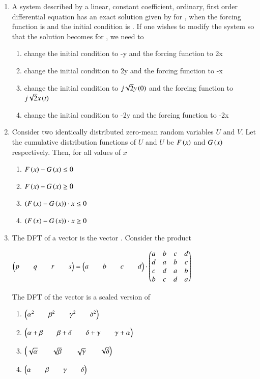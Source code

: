 \documentclass[journal,12pt,onecolumn]{IEEEtran}
\theoremstyle{remark}
\begin{document}
\begin{enumerate}
\item A system described by a linear, constant coefficient, ordinary, first order differential equation has an exact solution given by  for , when the forcing function is  and the initial condition is . If one wishes to modify the system so that the solution becomes for , we need to
\begin{enumerate}
\item change the initial condition to -y and the forcing function to 2x
\item change the initial condition to 2y and the forcing function to -x
\item change the initial condition to $j\sqrt{2}y\left(0\right)$ and the forcing function to $j\sqrt{2} x\left(t\right)$
\item change the initial condition to -2y and the forcing function to -2x
\end{enumerate}
\hfill {}

\item Consider two identically distributed zero-mean random variables $U$ and $V$. Let the cumulative distribution functions of $U$ and $U$ be $F\left(x\right)$  and $G\left(x\right)$ respectively. Then, for all values of  $x$
\begin{multicols}{2}
\begin{enumerate}
\item  $F\left(x\right) - G\left(x\right) \leq 0 $
\item  $F\left(x\right) - G\left(x\right) \geq 0 $
\item  $\left(F\left(x\right) - G\left(x\right)\right) \cdot x \leq 0 $
\item $ \left(F\left(x\right) - G\left(x\right)\right) \cdot x \geq 0 $
\end{enumerate}
\end{multicols}
\hfill {}

\item The DFT of a vector  is the vector . Consider the product


$\begin{pmatrix}p&&q&&r&&s\end{pmatrix} = \begin{pmatrix}a&&b&&c&&d\end{pmatrix} \cdot
\begin{pmatrix}
a & b & c & d \\
d & a & b & c \\
c & d & a & b \\
b & c & d & a\end{pmatrix}$


The DFT of the vector  is a scaled version of
\begin{multicols}{2}
\begin{enumerate}
\item $\begin{pmatrix}\alpha^2&&\beta^2&&\gamma^2&&\delta^2\end{pmatrix}$
\item $\begin{pmatrix}\alpha+ \beta&&\beta+\delta &&\delta+\gamma&&\gamma + \alpha\end{pmatrix}$
\item $\begin{pmatrix}\sqrt{\alpha}&&\sqrt{\beta}&&\sqrt{\gamma}&&\sqrt{\delta}\end{pmatrix}$
\item $\begin{pmatrix}\alpha&&\beta&&\gamma&&\delta\end{pmatrix}$
\end{enumerate}
\end{multicols}
\hfill {}


\end{enumerate}
\end{document}
